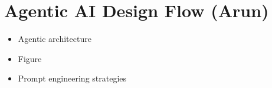 \section{Agentic AI Design Flow (Arun)}
\label{sec:agentic}
\begin{itemize}
    \item Agentic architecture
    \item Figure
    \item Prompt engineering strategies
\end{itemize}